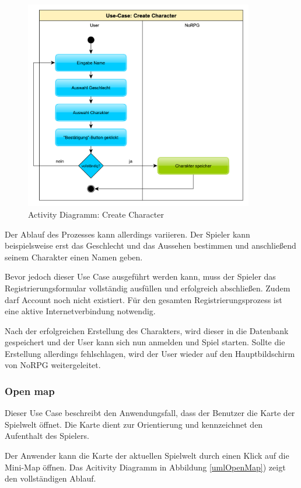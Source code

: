 			\begin{figure}[htbp]
				\centering 
				\label{createCharakter}
				\includegraphics[width=10cm]{pics/CreateCharacter.pdf}
				\caption{Activity Diagramm: Create Character}
			\end{figure}
		
			Der Ablauf des Prozesses kann allerdings variieren. Der Spieler kann beispielsweise erst das Geschlecht und das Aussehen bestimmen und anschließend seinem Charakter einen Namen geben.
	
			Bevor jedoch dieser Use Case ausgeführt werden kann, muss der Spieler das Registrierungsformular vollständig ausfüllen und erfolgreich abschließen. Zudem darf Account noch nicht existiert. Für den gesamten Registrierungsprozess ist eine aktive Internetverbindung notwendig.
			
			Nach der erfolgreichen Erstellung des Charakters, wird dieser in die Datenbank gespeichert und der User kann sich nun anmelden und Spiel starten. Sollte die Erstellung allerdings fehlschlagen, wird der User wieder auf den Hauptbildschirm von NoRPG weitergeleitet. 
			
		\subsubsection{Open map}
			Dieser Use Case beschreibt den Anwendungsfall, dass der Benutzer die Karte der Spielwelt öffnet. Die Karte dient zur Orientierung und kennzeichnet den Aufenthalt des Spielers.
			
			Der Anwender kann die Karte der aktuellen Spielwelt durch einen Klick auf die Mini-Map öffnen. Das Acitivity Diagramm in Abbildung \ref{umlOpenMap}) zeigt den vollständigen Ablauf.
			
